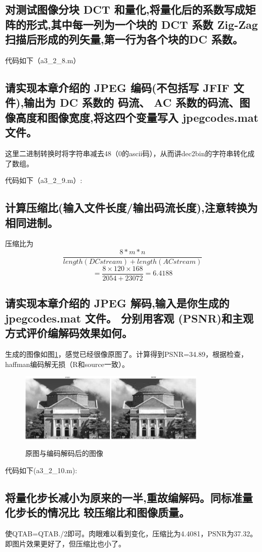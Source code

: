 \documentclass{ctexart}
\begin{document}
\subsection{
对测试图像分块 DCT 和量化,将量化后的系数写成矩阵的形式,其中每一列为一个块的 DCT 系数 Zig-Zag 扫描后形成的列矢量,第一行为各个块的DC 系数。
}
代码如下（a3\_2\_8.m）

\subsection{
请实现本章介绍的 JPEG 编码(不包括写 JFIF 文件),输出为 DC 系数的
码流、 AC 系数的码流、图像高度和图像宽度,将这四个变量写入 jpegcodes.mat
文件。
}
这里二进制转换时将字符串减去48（0的ascii码），从而讲dec2bin的字符串转化成了数组。

代码如下（a3\_2\_9.m）:

\subsection{
 计算压缩比(输入文件长度/输出码流长度),注意转换为相同进制。
}
压缩比为\[\frac{8*m*n}{length(DCstream)+length(ACstream)}\]
\[=\frac{8\times 120 \times 168}{2054+23072}=6.4188\]

\subsection{
请实现本章介绍的 JPEG 解码,输入是你生成的 jpegcodes.mat 文件。
分别用客观 (PSNR)和主观方式评价编解码效果如何。
}
生成的图像如图\ref{a3210}，感觉已经很像原图了。计算得到PSNR=34.89，根据检查，haffman编码解无损（R和source一致）。
\begin{figure}
    \centering
    \includegraphics[width=0.8\textwidth]{pic/a3_2_10.jpg}\\
    \caption{原图与编码解码后的图像\label{a3210}}
\end{figure}

代码如下(a3\_2\_10.m):


\subsection{
将量化步长减小为原来的一半,重故编解码。同标准量化步长的情况比
较压缩比和图像质量。
}
使QTAB=QTAB./2即可。肉眼难以看到变化，压缩比为4.4081，PSNR为37.32。即图片效果更好了，但压缩比也小了。
\end{document}
